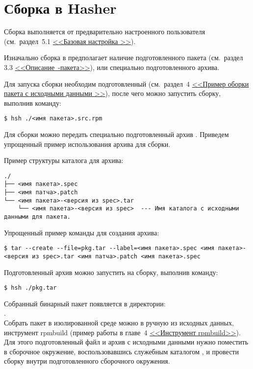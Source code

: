 \section{Сборка в Hasher}
Сборка выполняется от предварительно настроенного пользователя
(см.~раздел~5.1 \hyperlink{5.1}{<<Базовая настройка >>}).

Изначально сборка в  предполагает наличие подготовленного  пакета
(см.~раздел 3.3 \hyperlink{rpm-pack-desc}{\mbox{<<Описание -пакета>>}}),
или специально подготовленного  архива.

Для запуска сборки необходим подготовленный  (см.~раздел~4
\hyperlink{rpmbuild-exampl-src}{<<Пример оборки пакета с исходными данными >>}),
после чего можно запустить сборку, выполнив команду:

\begin{verbatim}
$ hsh ./<имя пакета>.src.rpm
\end{verbatim}

Для сборки можно передать специально подготовленный архив . Приведем упрощенный пример
использования архива для сборки.

Пример структуры каталога для архива:
\begin{verbatim}
./
├── <имя пакета>.spec
├── <имя патча>.patch
└── <имя пакета>-<версия из spec>.tar
    └── <имя пакета>-<версия из spec>  --- Имя каталога с исходными данными для пакета.
\end{verbatim}

Упрощенный пример команды для создания  архива:
\begin{verbatim}
$ tar --create --file=pkg.tar --label=<имя пакета>.spec <имя пакета>-<версия из spec>.tar <имя патча>.patch <имя пакета>.spec
\end{verbatim}

Подготовленный архив можно запустить на сборку, выполнив команду:
\begin{verbatim}
$ hsh ./pkg.tar
\end{verbatim}

Собранный бинарный пакет появляется в директории:\\ .\\

Собрать пакет в изолированной среде можно в ручную из исходных данных, инструмент rpmbuild (пример работы
в главе~4  \hyperlink{rpmbuild}{<<Инструмент rpmbuild>>}). Для этого подготовленный файл  и архив
с исходными данными нужно поместить в сборочное окружение, воспользовавшись служебным каталогом
, и провести сборку  внутри подготовленного сборочного окружения.


